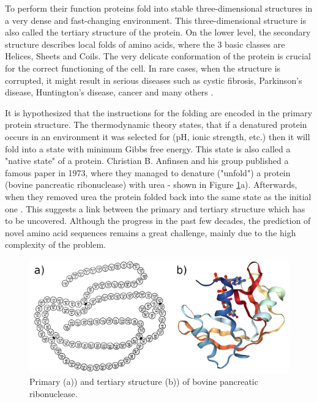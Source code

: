 To perform their function proteins fold into stable three-dimensional structures in a very dense and fast-changing environment.
This three-dimensional structure is also called the tertiary structure of the protein. 
On the lower level, the secondary structure describes local folds of amino acids, where the 3 basic classes are Helices, Sheets and Coils.
The very delicate conformation of the protein is crucial for the correct functioning of the cell.
In rare cases, when the structure is corrupted, it might result in serious diseases such as cystic fibrosis, Parkinson's disease, Huntington's disease, cancer and many others \cite{protein_misfolding_diseases}.

It is hypothesized that the instructions for the folding are encoded in the primary protein structure. 
The thermodynamic theory states, that if a denatured protein occurs in an environment it was selected for (pH, ionic strength, etc.) then it will fold into a state with minimum Gibbs free energy.
This state is also called a "native state" of a protein. 
Christian B. Anfinsen and his group published a famous paper in 1973, where they managed to denature ("unfold") a protein (bovine pancreatic ribonuclease) with urea - shown in Figure \ref{fig:primarytertiary}a). 
Afterwards, when they removed urea the protein folded back into the same state as the initial one \cite{anfinsen}. 
This suggests a link between the primary and tertiary structure which has to be uncovered. 
Although the progress in the past few decades, the prediction of novel amino acid sequences remains a great challenge, mainly due to the high complexity of the problem.

\begin{figure}[b!]
    \centering
    \includegraphics[width=\linewidth]{imgs_tomas/primary_tertiary.png}
    \caption{Primary (a)) \cite{anfinsen} and tertiary structure (b)) \cite{pdb} of bovine pancreatic ribonuclease.}
    \label{fig:primarytertiary}
\end{figure}


